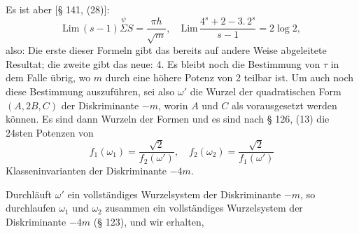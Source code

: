 
Es ist aber [§ 141, (28)]:
\[
\mathrm{Lim}\,(s-1) \overset{\psi}{\Sigma} S = \frac{\pi h}{\sqrt{m}}, \quad \mathrm{Lim}\,\frac{4^s + 2 - 3.\,2^s}{s-1} = 2 \log 2,
\]
also:
Die erste dieser Formeln gibt das bereits auf andere Weise
abgeleitete Resultat; die zweite gibt das neue:
4. Es bleibt noch die Bestimmung von $\tau$ in dem Falle übrig,
wo $m$ durch eine höhere Potenz von 2 teilbar ist. Um auch noch
diese Bestimmung auszuführen, sei
also $\omega'$ die Wurzel der quadratischen Form $(A, 2B, C)$ der
Diskriminante $-m$, worin $A$ und $C$ als  vorausgesetzt
werden können. Es sind dann
Wurzeln der Formen
und es sind nach § 126, (13) die 24sten Potenzen von
\[
f_1(\omega_1) = \frac{\sqrt{2}}{f_2(\omega')}, \quad f_2(\omega_2) = \frac{\sqrt{2}}{f_1(\omega')}
\]
Klasseninvarianten der Diskriminante $-4m$.

Durchläuft $\omega'$ ein vollständiges Wurzelsystem der Diskriminante $-m$, so durchlaufen $\omega_1$ und $\omega_2$ zusammen ein vollständiges
Wurzelsystem der Diskriminante $-4m$ (§ 123), und wir erhalten,
